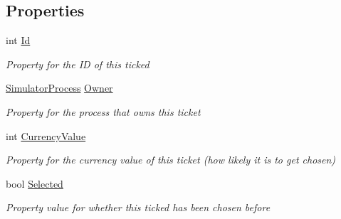 \subsection*{Properties}
\begin{DoxyCompactItemize}
\item 
int \hyperlink{class_c_p_u___o_s___simulator_1_1_operating___system_1_1_lottery_ticket_a36be2545d1ee5498d1c309a5a39ec181}{Id}
\begin{DoxyCompactList}\small\item\em Property for the I\+D of this ticked \end{DoxyCompactList}\item 
\hyperlink{class_c_p_u___o_s___simulator_1_1_operating___system_1_1_simulator_process}{Simulator\+Process} \hyperlink{class_c_p_u___o_s___simulator_1_1_operating___system_1_1_lottery_ticket_ab500b400dea7b986bad4dd13c376f9d2}{Owner}
\begin{DoxyCompactList}\small\item\em Property for the process that owns this ticket \end{DoxyCompactList}\item 
int \hyperlink{class_c_p_u___o_s___simulator_1_1_operating___system_1_1_lottery_ticket_aa76a95e5f004a621d2eb1230c6680273}{Currency\+Value}
\begin{DoxyCompactList}\small\item\em Property for the currency value of this ticket (how likely it is to get chosen) \end{DoxyCompactList}\item 
bool \hyperlink{class_c_p_u___o_s___simulator_1_1_operating___system_1_1_lottery_ticket_aedda5be8ac6feb49a7a140af4e99a7ad}{Selected}
\begin{DoxyCompactList}\small\item\em Property value for whether this ticked has been chosen before \end{DoxyCompactList}\end{DoxyCompactItemize}
